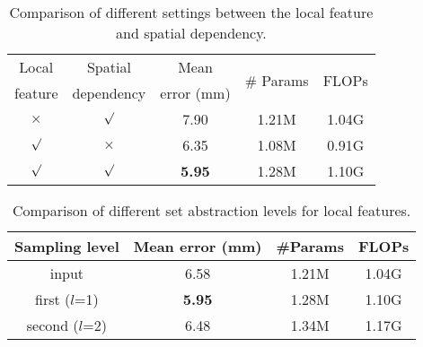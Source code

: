 \documentclass[10pt,twocolumn,letterpaper]{article}
\begin{document}
\begin{table}[h!]
\small
\begin{center}

\begin{tabular}{cc|ccc}
\hline

Local & Spatial & Mean & \multirow{2}{*}{\# Params} & \multirow{2}{*}{FLOPs}\\
feature & dependency &  error (mm) &   &  \\
\hline


$\times$ & $\surd$ &  7.90 & 1.21M & 1.04G \\
$\surd$ & $\times$ &  6.35 & 1.08M & 0.91G \\
$\surd$ &  $\surd$ &  \textbf{5.95} & 1.28M & 1.10G \\
\hline

\end{tabular}
\end{center}
\caption{Comparison of different settings between the local feature and spatial dependency. 
}
\label{tab:localspatial}
\end{table}

\begin{table}[h!]
\small
\begin{center}

\begin{tabular}{c|ccc}
\hline

Sampling level &  Mean error (mm) & \#Params & FLOPs \\ 
\hline


input &  6.58 & 1.21M & 1.04G\\
first ($l$=1) &  \textbf{5.95} & 1.28M & 1.10G\\
second ($l$=2) &  6.48 & 1.34M & 1.17G\\
\hline

\end{tabular}
\end{center}
\caption{Comparison of different set abstraction levels for local features. 
}
\label{tab:level}
\end{table}
\end{document}
